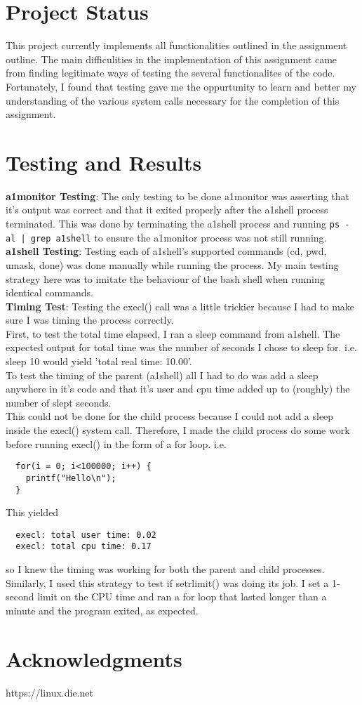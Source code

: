 \documentclass{article}
\begin{document}
\section{Project Status}
This project currently implements all functionalities outlined in the
assignment outline. The main difficulities in the implementation of this
assignment came from finding legitimate ways of testing the several
functionalites of the code. Fortunately, I found that testing gave me the
oppurtunity to learn and better my understanding of the various system calls
necessary for the completion of this assignment.


\section{Testing and Results}
\textbf{a1monitor Testing}: The only testing to be done a1monitor was asserting that
it's output was correct and that it exited properly after the a1shell process
terminated. This was done by terminating the a1shell process and running
\verb=ps -al | grep a1shell= to ensure the a1monitor process was not still running. \\

\noindent
\textbf{a1shell Testing}: Testing each of a1shell's supported commands (cd, pwd,
umask, done) was done manually while running the process. My main testing strategy
here was to imitate the behaviour of the bash shell when running identical commands. \\

\noindent
\textbf{Timing Test}: Testing the execl() call was a little trickier because I
had to make sure I was timing the process correctly. \\
\noindent
First, to test the total time elapsed, I ran a sleep command
from a1shell. The expected output for total time was the number of seconds I chose
to sleep for. i.e. sleep 10 would yield 'total real time: 10.00'. \\
To test the timing of the parent (a1shell) all I had to do was add a sleep anywhere
in it's code and that it's user and cpu time added up to (roughly) the number of slept
seconds. \\
This could not be done for the child process because I could not add a sleep inside
the execl() system call. Therefore, I made the child process do some work before
running execl() in the form of a for loop. i.e.
\begin{verbatim}
  for(i = 0; i<100000; i++) {
    printf("Hello\n");
  }
\end{verbatim}
This yielded
\begin{verbatim}
  execl: total user time: 0.02
  execl: total cpu time: 0.17
\end{verbatim}
so I knew the timing was working for both the parent and child processes. \\

\noindent
Similarly, I used this strategy to test if setrlimit() was doing its job.
I set a 1-second limit on the CPU time and ran a for loop that lasted longer than
a minute and the program exited, as expected. \\
\section{Acknowledgments}
https://linux.die.net
\end{document}
